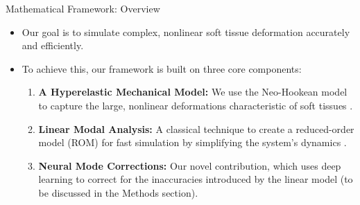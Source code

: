 \documentclass{beamer}
\begin{document}
\begin{frame}{Mathematical Framework: Overview}
    \begin{itemize}
        \item Our goal is to simulate complex, nonlinear soft tissue deformation accurately and efficiently.
        \vspace{1em}
        \item To achieve this, our framework is built on three core components:
        
        \begin{enumerate}
            \item \textbf{A Hyperelastic Mechanical Model:} We use the Neo-Hookean model to capture the large, nonlinear deformations characteristic of soft tissues \cite{Ogden_1997}.
            \vspace{1em}
            
            \item \textbf{Linear Modal Analysis:} A classical technique to create a reduced-order model (ROM) for fast simulation by simplifying the system's dynamics \cite{Pentland_Williams_1989}.
            \vspace{1em}
            
            \item \textbf{Neural Mode Corrections:} Our novel contribution, which uses deep learning to correct for the inaccuracies introduced by the linear model (to be discussed in the Methods section).
        \end{enumerate}
    \end{itemize}
\end{frame}
\end{document}

